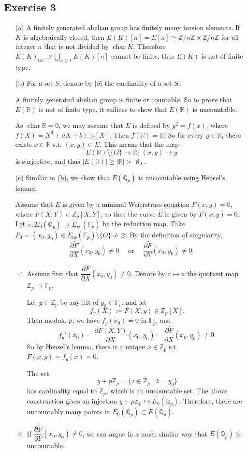 \documentclass{article}
\theoremstyle{definition}
\theoremstyle{remark}
\newcommand{\R}{\mathbb{R}}
\newcommand{\Q}{\mathbb{Q}}
\newcommand{\Z}{\mathbb{Z}}
\newcommand{\F}{\mathbb{F}}
\DeclareMathOperator{\cha}{char} %
\newcommand{\pdfrac}[2]{\dfrac{\partial #1}{\partial #2}} %
\newcommand{\tor}{\mathrm{tor}}
\newcommand{\ns}{\mathrm{ns}}
\begin{document}
\subsection*{Exercise 3}
\begin{enumerate}
\item [(a)] A finitely generated abelian group has finitely many torsion elements.
If $K$ is algebraically closed,
then $E(K)[n] = E[n] \simeq \Z/n\Z\times \Z/n\Z$
for all integer $n$ that is not divided by $\cha K$.
Therefore $E(K)_\tor\supset \bigcup_{n\ge 1}E(K)[n]$ cannot be finite, thus $E(K)$ is not of finite type.
\item [(b)]
For a set $S$, denote by $|S|$ the cardinality of a set $S$.

A finitely generated abelian group is finite or countable. So to prove that $E(\R)$ is not of finite type, it suffices to show that $E(\R)$ is uncountable.

As $\cha \R = 0$, we may assume that $E$ is defined by $y^2 = f(x)$, where $f(X) = X^3 + aX +b\in \R[X]$.
Then $f(\R) = \R$. So for every $y\in\R$, there exists $x\in\R$ s.t. $(x, y)\in E$.
This means that the map \[E(\R)\setminus \{O\}\to \R,\ (x, y)\mapsto y\] is surjective, and thus $|E(\R)|\ge |\R| > \aleph_0$.

\item [(c)]
Similar to (b), we show that $E(\Q_p)$ is uncountable using Hensel's lemma.

Assume that $E$ is given by a minimal Weierstrass equation $F(x, y) = 0$,
where $F(X, Y)\in \Z_p[X, Y]$, so that the curve $\tilde{E}$ is given by $\tilde{F}(x, y) = 0$.
Let $\pi : E_0(\Q_p)\to\tilde{E}_\ns(\F_p)$ be the reduction map.
Take $P_0 = (x_0, y_0)\in \tilde{E}_\ns(\F_p)\setminus\{O\}\ne\varnothing$.
By the definition of singularity,
\[\pdfrac{\tilde{F}}{X}(x_0, y_0) \ne 0
\quad\text{   or   }\quad
\pdfrac{\tilde{F}}{Y}(x_0, y_0) \ne 0.\]
\begin{itemize}
\item Assume first that $\pdfrac{\tilde{F}}{X}(x_0, y_0) \ne 0$.
Denote by $a\mapsto\bar{a}$ the quotient map $\Z_p\to\F_p$.

Let $y\in\Z_p$ be any lift of $y_0\in\F_p$,
and let \[f_y(X) := F(X, y)\in \Z_p[X].\]
Then modulo $p$, we have $\overline{f_y(x_0)} = 0$ in $\F_p$,
and \[\overline{f_y'(x_0)} = \overline{\pdfrac{F(X, Y)}{X}}(x_0, y_0) = \pdfrac{\tilde{F}}{X}(x_0, y_0)\ne 0.\]
So by Hensel's lemma, there is a unique $x\in\Z_p$ s.t. $F(x, y) = f_y(x) = 0$.

The set \[y + p\Z_p = \{z\in\Z_p\mid \bar{z} = y_0\}\] has cardinality equal to $\Z_p$,
which is an uncountable set.
The above construction gives an injection $y + p\Z_p\hookrightarrow E_0(\Q_p)$.
Therefore, there are uncountably many points in $E_0(\Q_p)\subset E(\Q_p)$.

\item If $\pdfrac{\tilde{F}}{Y}(x_0, y_0) \ne 0$, we can argue in a much similar way that $E(\Q_p)$ is uncountable.
\end{itemize}

\end{enumerate}
\end{document}
